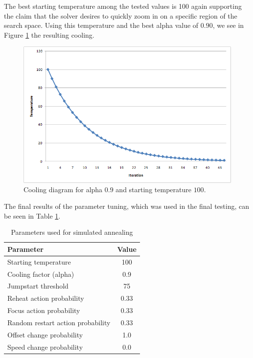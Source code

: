 The best starting temperature among the tested values is 100 again supporting the claim that the solver desires to quickly zoom in on a specific region of the search space. Using this temperature and the best alpha value of $0.90$, we see in Figure \ref{fig:cooling_scheme} the resulting cooling.

\begin{figure}[ht]
\centering
\includegraphics[scale=0.3]{temp-vs-iter_alpha09_starttemp100.png}
\caption{Cooling diagram for alpha $0.9$ and starting temperature $100$.}
\label{fig:cooling_scheme}
\end{figure}

The final results of the parameter tuning, which was used in the final testing, can be seen in Table \ref{tab:saparms}.

\begin{table}[ht]
\centering
\begin{tabular}{l|c}
\textbf{Parameter} & \textbf{Value}\\ \hline
Starting temperature & 100 \\
Cooling factor (alpha) & 0.9 \\ 
Jumpstart threshold & 75 \\
Reheat action probability & 0.33 \\
Focus action probability & 0.33 \\
Random restart action probability & 0.33 \\
Offset change probability & 1.0 \\
Speed change probability & 0.0
\end{tabular}
\caption{Parameters used for simulated annealing}
\label{tab:saparms}
\end{table}


